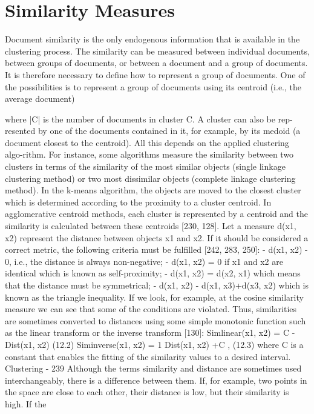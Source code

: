 \documentclass[11pt,openany,executivepaper]{book}
\begin{document}
\section{Similarity Measures}

Document similarity is the only endogenous information that is available in the
clustering process. The similarity can be measured between individual documents, between groups of documents, or between a document and a group of
documents. It is therefore necessary to define how to represent a group of documents. One of the possibilities is to represent a group of documents using its
centroid (i.e., the average document)

where |C| is the number of documents in cluster C. A cluster can also be rep-resented by one of the documents contained in it, for example, by its medoid (a
document closest to the centroid). All this depends on the applied clustering algo-rithm. For instance, some algorithms measure the similarity between two clusters
in terms of the similarity of the most similar objects (single linkage clustering
method) or two most dissimilar objects (complete linkage clustering method).
In the k-means algorithm, the objects are moved to the closest cluster which is
determined according to the proximity to a cluster centroid. In agglomerative
centroid methods, each cluster is represented by a centroid and the similarity is
calculated between these centroids [230, 128].
Let a measure d(x1, x2) represent the distance between objects x1 and x2. If
it should be considered a correct metric, the following criteria must be fulfilled
[242, 283, 250]:
-
d(x1, x2) - 0, i.e., the distance is always non-negative;
-
d(x1, x2) = 0 if x1 and x2 are identical which is known as self-proximity;
-
d(x1, x2) = d(x2, x1) which means that the distance must be symmetrical;
-
d(x1, x2) - d(x1, x3)+d(x3, x2) which is known as the triangle inequality.
If we look, for example, at the cosine similarity measure we can see that
some of the conditions are violated. Thus, similarities are sometimes converted
to distances using some simple monotonic function such as the linear transform
or the inverse transform [130]:
Simlinear(x1, x2) = C -Dist(x1, x2) (12.2)
Siminverse(x1, x2) = 1
Dist(x1, x2) +C
, (12.3)
where C is a constant that enables the fitting of the similarity values to a
desired interval.
Clustering - 239
Although the terms similarity and distance are sometimes used interchangeably, there is a difference between them. If, for example, two points in the space
are close to each other, their distance is low, but their similarity is high. If the
\end{document}
